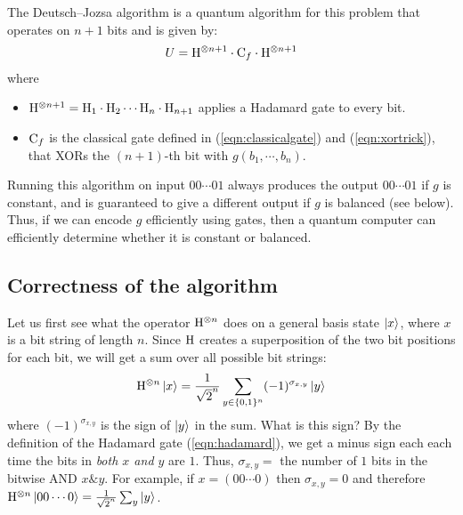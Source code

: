 The Deutsch–Jozsa algorithm \cite{deutschRapidSolutionProblems1992,DeutschJozsaAlgorithm2021} is a quantum algorithm for this problem that operates on $n+1$ bits and is given by:
\begin{align*}
  U = \mathrm{H}^{\otimes n+1} \cdot \mathrm{C}_f \cdot \mathrm{H}^{\otimes n+1}
\end{align*}
where
\begin{itemize}
  \item $\mathrm{H}^{\otimes n+1} = \mathrm{H}_1 \cdot \mathrm{H}_2 \cdots \mathrm{H}_n \cdot \mathrm{H}_{n+1}$ applies a Hadamard gate to every bit.
  \item $\mathrm{C}_f$ is the classical gate defined in (\ref{eqn:classicalgate}) and (\ref{eqn:xortrick}), that XORs the $(n+1)$-th bit with $g(b_1,\cdots,b_{n})$.
\end{itemize}

Running this algorithm on input $00\cdots01$ always produces the output $00\cdots01$ if $g$ is constant,
and is guaranteed to give a different output if $g$ is balanced (see below).
Thus, if we can encode $g$ efficiently using gates, then a quantum computer can efficiently determine whether it is constant or balanced.

\subsection{Correctness of the algorithm}

Let us first see what the operator $\mathrm{H}^{\otimes n}$ does on a general basis state $\ket{x}$, where $x$ is a bit string of length $n$.
Since $\mathrm{H}$ creates a superposition of the two bit positions for each bit, we will get a sum over all possible bit strings:
\begin{align*}
  \mathrm{H}^{\otimes n} \ket{x} = \frac{1}{\sqrt{2}^n} \sum_{y \in \{0,1\}^n} (-1)^{\sigma_{x,y}} \ket{y}
\end{align*}
where $(-1)^{\sigma_{x,y}}$ is the sign of $\ket{y}$ in the sum.
What is this sign?
By the definition of the Hadamard gate (\ref{eqn:hadamard}), we get a minus sign each each time the bits in \emph{both $x$ and $y$} are $1$.
Thus, $\sigma_{x,y} =$ the number of $1$ bits in the bitwise AND $x \& y$.
For example, if $x = (00\cdots0)$ then $\sigma_{x,y} = 0$ and therefore $\mathrm{H}^{\otimes n} \ket{00\cdots0} = \frac{1}{\sqrt{2}^n} \sum_y \ket{y}$.

\newcommand{\nexttag}[1]{\tag{#1 $\mapsto$}}

